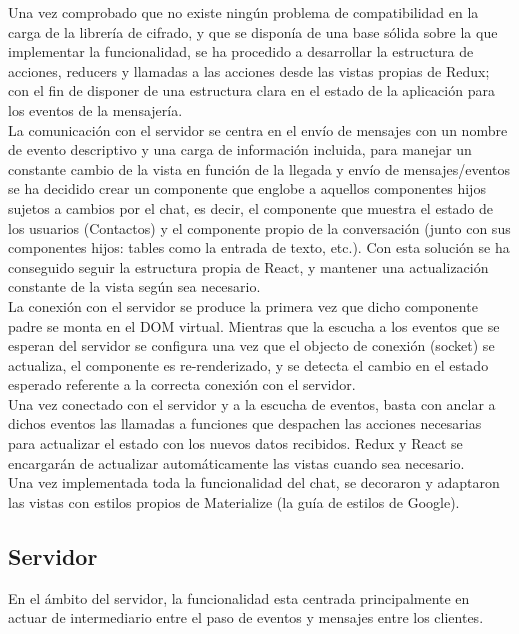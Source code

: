 Una vez comprobado que no existe ningún problema de compatibilidad en la carga de la librería de cifrado, y que se disponía de una base sólida sobre la que implementar la funcionalidad, se ha procedido a desarrollar la estructura de acciones, reducers y llamadas a las acciones desde las vistas propias de Redux; con el fin de disponer de una estructura clara en el estado de la aplicación para los eventos de la mensajería. \\

La comunicación con el servidor se centra en el envío de mensajes con un nombre de evento descriptivo y una carga de información incluida, para manejar un constante cambio de la vista en función de la llegada y envío de mensajes/eventos se ha decidido crear un componente que englobe a aquellos componentes hijos sujetos a cambios por el chat, es decir, el componente que muestra el estado de los usuarios (Contactos) y el componente propio de la conversación (junto con sus componentes hijos: tables como la entrada de texto, etc.). Con esta solución se ha conseguido seguir la estructura propia de React, y mantener una actualización constante de la vista según sea necesario. \\

La conexión con el servidor se produce la primera vez que dicho componente padre se monta en el DOM virtual. Mientras que la escucha a los eventos que se esperan del servidor se configura una vez que el objecto de conexión (socket) se actualiza, el componente es re-renderizado, y se detecta el cambio en el estado esperado referente a la correcta conexión con el servidor. \\

Una vez conectado con el servidor y a la escucha de eventos, basta con anclar a dichos eventos las llamadas a funciones que despachen las acciones necesarias para actualizar el estado con los nuevos datos recibidos. Redux y React se encargarán de actualizar automáticamente las vistas cuando sea necesario. \\

Una vez implementada toda la funcionalidad del chat, se decoraron y adaptaron las vistas con estilos propios de Materialize (la guía de estilos de Google). \\


\subsection{Servidor}

En el ámbito del servidor, la funcionalidad esta centrada principalmente en actuar de intermediario entre el paso de eventos y mensajes entre los clientes. \\ 

